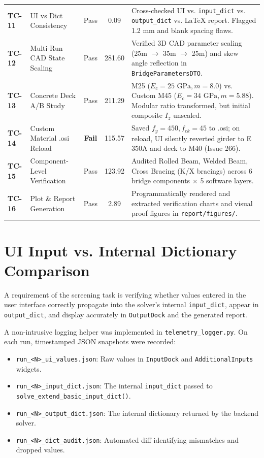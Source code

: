 \documentclass[11pt,a4paper]{article}
\begin{document}
\begin{table}[htbp]
\begin{tabularx}{\textwidth}{lp{3.5cm}ccX}
\textbf{TC-11} & UI vs Dict Consistency & Pass & 0.09 & Cross-checked UI vs. \texttt{input\_dict} vs. \texttt{output\_dict} vs. LaTeX report. Flagged 1.2 mm and blank spacing flaws. \\
\textbf{TC-12} & Multi-Run CAD State Scaling & Pass & 281.60 & Verified 3D CAD parameter scaling (25m $\rightarrow$ 35m $\rightarrow$ 25m) and skew angle reflection in \texttt{BridgeParametersDTO}. \\
\textbf{TC-13} & Concrete Deck A/B Study & Pass & 211.29 & M25 ($E_c=25\text{ GPa}, m=8.0$) vs. Custom M45 ($E_c=34\text{ GPa}, m=5.88$). Modular ratio transformed, but initial composite $I_z$ unscaled. \\
\textbf{TC-14} & Custom Material .osi Reload & \textbf{Fail} & 115.57 & Saved $f_y=450, f_{ck}=45$ to .osi; on reload, UI silently reverted girder to E 350A and deck to M40 (Issue 266). \\
\textbf{TC-15} & Component-Level Verification & Pass & 123.92 & Audited Rolled Beam, Welded Beam, Cross Bracing (K/X bracings) across 6 bridge components $\times$ 5 software layers. \\
\textbf{TC-16} & Plot \& Report Generation & Pass & 2.89 & Programmatically rendered and extracted verification charts and visual proof figures in \texttt{report/figures/}. \\
\bottomrule
\end{tabularx}
\end{table}

\section{UI Input vs. Internal Dictionary Comparison}

A requirement of the screening task is verifying whether values entered in the user interface correctly propagate into the solver's internal \texttt{input\_dict}, appear in \texttt{output\_dict}, and display accurately in \texttt{OutputDock} and the generated report.

A non-intrusive logging helper was implemented in \texttt{telemetry\_logger.py}. On each run, timestamped JSON snapshots were recorded:
\begin{itemize}
    \item \texttt{run\_<N>\_ui\_values.json}: Raw values in \texttt{InputDock} and \texttt{AdditionalInputs} widgets.
    \item \texttt{run\_<N>\_input\_dict.json}: The internal \texttt{input\_dict} passed to \texttt{solve\_extend\_basic\_input\_dict()}.
    \item \texttt{run\_<N>\_output\_dict.json}: The internal dictionary returned by the backend solver.
    \item \texttt{run\_<N>\_dict\_audit.json}: Automated diff identifying mismatches and dropped values.
\end{itemize}
\end{document}
